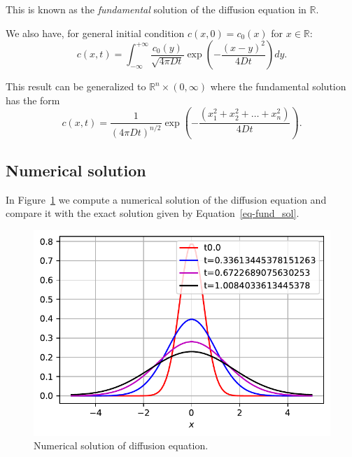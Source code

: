 \documentclass[
  letterpaper,
  DIV=11,
  numbers=noendperiod]{scrreprt}
\theoremstyle{plain}
\theoremstyle{definition}
\theoremstyle{plain}
\theoremstyle{remark}
\begin{document}
This is known as the \emph{fundamental} solution of the diffusion
equation in \(\mathbb R\).

We also have, for general initial condition \(c(x, 0) = c_0(x)\) for
\(x\in \mathbb R\): \[
c(x, t) = \int_{-\infty}^{+\infty} \frac{c_0(y)}{\sqrt{4 \pi D t}} \exp \left( - \frac{ (x-y)^2}{ 4Dt} \right) dy.
\]

This result can be generalized to \(\mathbb R^n\times (0,\infty)\) where
the fundamental solution has the form \[
c(x,t) =  \frac 1{(4 \pi D t)^{n/2}} \exp \left( - \frac{ (x_{1}^{2} + x_{2}^{2} + \ldots + x_{n}^{2})}{ 4Dt} \right).
\]

\hypertarget{numerical-solution}{%
\subsection{Numerical solution}\label{numerical-solution}}

In Figure~\ref{fig-diffusionpde} we compute a numerical solution of the
diffusion equation and compare it with the exact solution given by
Equation~\ref{eq-fund_sol}.

\begin{figure}

{\centering \includegraphics{linearreactiondiffusion_files/figure-pdf/fig-diffusionpde-output-1.pdf}

}

\caption{\label{fig-diffusionpde}Numerical solution of diffusion
equation.}

\end{figure}
\end{document}
